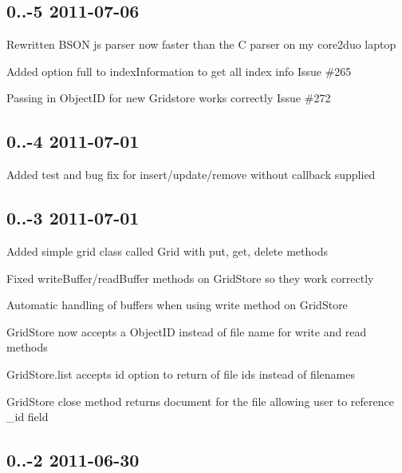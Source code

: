 \subsection*{0..-\/5 2011-\/07-\/06 }


\begin{DoxyItemize}
\item Rewritten B\+S\+ON js parser now faster than the C parser on my core2duo laptop
\item Added option full to index\+Information to get all index info Issue \#265
\item Passing in Object\+ID for new Gridstore works correctly Issue \#272
\end{DoxyItemize}

\subsection*{0..-\/4 2011-\/07-\/01 }


\begin{DoxyItemize}
\item Added test and bug fix for insert/update/remove without callback supplied
\end{DoxyItemize}

\subsection*{0..-\/3 2011-\/07-\/01 }


\begin{DoxyItemize}
\item Added simple grid class called Grid with put, get, delete methods
\item Fixed write\+Buffer/read\+Buffer methods on Grid\+Store so they work correctly
\item Automatic handling of buffers when using write method on Grid\+Store
\item Grid\+Store now accepts a Object\+ID instead of file name for write and read methods
\item Grid\+Store.\+list accepts id option to return of file ids instead of filenames
\item Grid\+Store close method returns document for the file allowing user to reference \+\_\+id field
\end{DoxyItemize}

\subsection*{0..-\/2 2011-\/06-\/30 }


